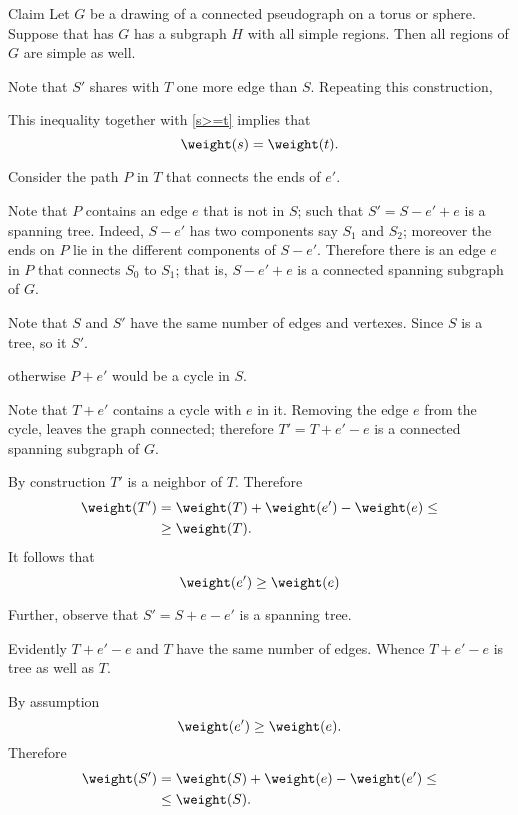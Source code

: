 \begin{thm}{Claim}\label{clm:simple-regions}
Let $G$ be a drawing of a connected pseudograph on a torus or sphere.
Suppose that has $G$ has a subgraph $H$ with all simple regions.
Then all regions of $G$ are simple as well.
\end{thm}

















Note that $S'$ shares with $T$ one more edge than $S$.
Repeating this construction,

This inequality together with \ref{s>=t} implies that
\[\weight(s)= \weight(t).\]

Consider the path $P$ in $T$ that connects the ends of $e'$.

Note that $P$ contains an edge $e$ that is not in $S$;
such that $S'=S-e'+e$ is a spanning tree.
Indeed, $S-e'$ has two components say $S_1$ and $S_2$;
moreover the ends on $P$ lie in the different components of $S-e'$.
Therefore there is an edge $e$ in $P$ that connects $S_0$ to $S_1$;
that is, $S-e'+e$ is a connected spanning subgraph of $G$.

Note that $S$ and $S'$ have the same number of edges and vertexes.
Since $S$ is a tree, so it $S'$.

otherwise $P+e'$ would be a cycle in $S$.

Note that  $T+e'$ contains a cycle with $e$ in it.
Removing the edge $e$ from the cycle, leaves the graph connected;
therefore $T'=T+e'-e$ is a connected spanning subgraph of $G$.

By construction $T'$ is a neighbor of $T$.
Therefore
\begin{align*}
\weight(T')&=\weight(T)+\weight(e')-\weight(e)\le
\\
&\ge\weight(T).
\end{align*}
It follows that 
\[\weight(e')\ge\weight(e)\]

Further, observe that $S'=S+e-e'$ is a spanning tree.


Evidently $T+e'-e$ and $T$ have the same number of edges.
Whence $T+e'-e$ is tree as well as $T$.

By assumption 
\[\weight(e')\ge \weight(e).\]
Therefore 
\begin{align*}
\weight(S')&=\weight(S)+\weight(e)-\weight(e')\le
\\
&\le\weight(S).
\end{align*}

